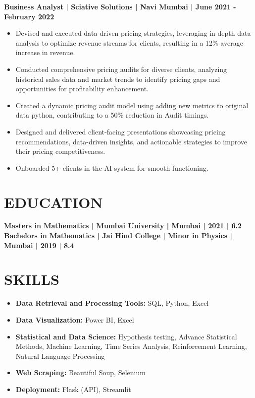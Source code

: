 \documentclass{article}
\begin{document}
\vspace{5mm} %

\noindent %
\textbf{Business Analyst | Sciative Solutions | Navi Mumbai | June 2021 - February 2022}
\begin{itemize}[leftmargin=*]
    \item Devised and executed data-driven pricing strategies, leveraging in-depth data analysis to optimize revenue streams for clients, resulting in a 12\% average increase in revenue.
    \item Conducted comprehensive pricing audits for diverse clients, analyzing historical sales data and market trends to identify pricing gaps and opportunities for profitability enhancement.
    \item Created a dynamic pricing audit model using adding new metrics to original data python, contributing to a 50\% reduction in Audit timings.
    \item Designed and delivered client-facing presentations showcasing pricing recommendations, data-driven insights, and actionable strategies to improve their pricing competitiveness.
    \item Onboarded 5+ clients in the AI system for smooth functioning.
\end{itemize}

\section*{EDUCATION}
\textbf{Masters in Mathematics | Mumbai University | Mumbai | 2021 | 6.2}
\newline
\textbf{Bachelors in Mathematics | Jai Hind College | Minor in Physics | Mumbai | 2019 | 8.4}

\section*{SKILLS}
\begin{itemize}[leftmargin=*]
    \item \textbf{Data Retrieval and Processing Tools:} SQL, Python, Excel
    \item \textbf{Data Visualization:} Power BI, Excel
    \item \textbf{Statistical and Data Science:} Hypothesis testing, Advance Statistical Methods, Machine Learning, Time Series Analysis, Reinforcement Learning, Natural Language Processing
    \item \textbf{Web Scraping:} Beautiful Soup, Selenium
    \item \textbf{Deployment:} Flask (API), Streamlit
\end{itemize}
\end{document}
